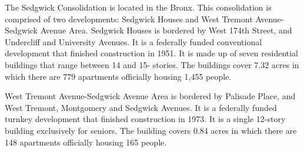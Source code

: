   

The Sedgwick Consolidation is located in the Bronx. This consolidation is comprised of two developments: Sedgwick Houses and West Tremont Avenue-Sedgwick Avenue Area. Sedgwick Houses is bordered by West 174th Street, and Undercliff and University Avenues. It is a federally funded conventional development that finished construction in 1951. It is made up of seven residential buildings that range between 14 and 15- stories. The buildings cover 7.32 acres in which there are 779 apartments officially housing 1,455 people.   

  

West Tremont Avenue-Sedgwick Avenue Area is bordered by Palisade Place, and West Tremont, Montgomery and Sedgwick Avenues. It is a federally funded turnkey development that finished construction in 1973. It is a single 12-story building exclusively for seniors. The building covers 0.84 acres in which there are 148 apartments officially housing 165 people.   

 